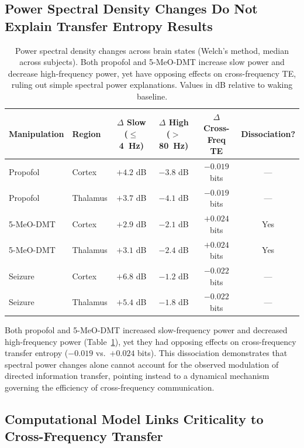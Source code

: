 \documentclass[11pt]{article}
\begin{document}
\subsection{Power Spectral Density Changes Do Not Explain Transfer Entropy Results}

\begin{table}[H]
\centering
\caption{Power spectral density changes across brain states (Welch's method, median across subjects). Both propofol and 5-MeO-DMT increase slow power and decrease high-frequency power, yet have opposing effects on cross-frequency TE, ruling out simple spectral power explanations. Values in dB relative to waking baseline.}
\label{tab:psd}
\begin{tabular}{llcccc}
\toprule
Manipulation & Region & $\Delta$ Slow ($\leq$4~Hz) & $\Delta$ High ($>$80~Hz) & $\Delta$ Cross-Freq TE & Dissociation? \\
\midrule
Propofol & Cortex & $+4.2$ dB & $-3.8$ dB & $-0.019$ bits & --- \\
Propofol & Thalamus & $+3.7$ dB & $-4.1$ dB & $-0.019$ bits & --- \\
5-MeO-DMT & Cortex & $+2.9$ dB & $-2.1$ dB & $+0.024$ bits & Yes \\
5-MeO-DMT & Thalamus & $+3.1$ dB & $-2.4$ dB & $+0.024$ bits & Yes \\
Seizure & Cortex & $+6.8$ dB & $-1.2$ dB & $-0.022$ bits & --- \\
Seizure & Thalamus & $+5.4$ dB & $-1.8$ dB & $-0.022$ bits & --- \\
\bottomrule
\end{tabular}
\end{table}

Both propofol and 5-MeO-DMT increased slow-frequency power and decreased high-frequency power (Table~\ref{tab:psd}), yet they had opposing effects on cross-frequency transfer entropy ($-0.019$ vs.\ $+0.024$ bits). This dissociation demonstrates that spectral power changes alone cannot account for the observed modulation of directed information transfer, pointing instead to a dynamical mechanism governing the efficiency of cross-frequency communication.

\subsection{Computational Model Links Criticality to Cross-Frequency Transfer}
\end{document}
